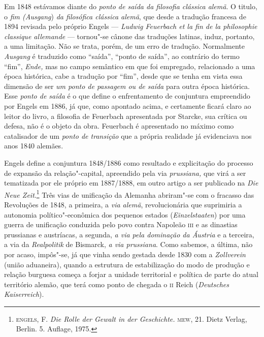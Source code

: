 Em 1848 estávamos diante do \emph{ponto de saída da filosofia clássica
alemã}. O titulo, o \emph{fim (Ausgang}) \emph{da filosófica clássica
alemã}, que desde a tradução francesa de 1894 revisada pelo próprio
Engels --- \emph{Ludwig Feuerbach et la fin de la philosophie classique
allemande} --- tornou"-se cânone das traduções latinas, induz, portanto,
a uma limitação. Não se trata, porém, de um erro de tradução.
Normalmente \emph{Ausgang} é traduzido como ``saída'', ``ponto de
saída'', ao contrário do termo ``fim'', \emph{Ende,} mas no campo
semântico em que foi empregado, relacionado a uma época histórica, cabe
a tradução por ``fim'', desde que se tenha em vista essa dimensão de ser
\emph{um ponto de passagem ou de saída} para outra época histórica. Esse
\emph{ponto de saída} é o que define o enfrentamento de conjuntura
empreendido por Engels em 1886, já que, como apontado acima, e
certamente ficará claro ao leitor do livro, a filosofia de Feuerbach
apresentada por Starcke, sua crítica ou defesa, não é o objeto da obra.
Feuerbach é apresentado no máximo como catalisador de um \emph{ponto de
transição} que a própria realidade já evidenciava nos anos 1840 alemães.

Engels define a conjuntura 1848/1886 como resultado e explicitação do
processo de expansão da relação"-capital, apreendido pela via
\emph{prussiana,} que virá a ser tematizada por ele próprio em
1887/1888, em outro artigo a ser publicado na \emph{Die Neue Zeit}.\footnote{\textsc{engels}, F. \emph{Die Rolle der Gewalt in der
  Geschichte.} \textsc{mew}, 21. Dietz Verlag, Berlin. 5. Auflage, 1975.}
Três vias de unificação da Alemanha abriram"-se com o fracasso das
Revoluções de 1848, a primeira, a \emph{via alemã}, revolucionária que
suprimiria a autonomia político"-econômica dos pequenos estados
(\emph{Einzelstaaten}) por uma guerra de unificação conduzida pelo povo
contra Napoleão \textsc{iii} e as dinastias prussianas e austríacas, a
segunda, \emph{a via pela dominação da Áustria} e a terceira, a via da
\emph{Realpolitik} de Bismarck, \emph{a via prussiana}. Como sabemos, a
última, não por acaso, impôs"-se, já que vinha sendo gestada desde 1830
com a \emph{Zollverein} (união aduaneira), quando a estrutura de
estabilização do modo de produção e relação burguesa começa a forjar a
unidade territorial e política de parte do atual território alemão, que
terá como ponto de chegada o \textsc{ii} Reich (\emph{Deutsches
Kaiserreich}).

